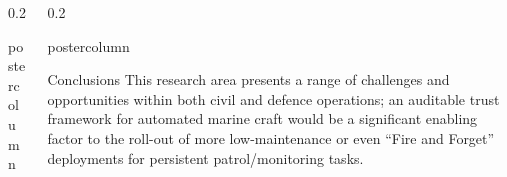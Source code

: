 \documentclass[final,hyperref={pdfpagelabels=false}]{beamer}
\def\colwidth{0.2\linewidth}
\begin{document}
\begin{frame}[fragile]
\begin{columns}[T]
\begin{column}{\colwidth}
\begin{beamercolorbox}[center,wd=\textwidth]{postercolumn}
\begin{minipage}[T]{.98\textwidth}
{					}
				\end{minipage}
			\end{beamercolorbox}
		\end{column}
		\begin{column}{\colwidth}
			\begin{beamercolorbox}[center,wd=\textwidth]{postercolumn}
				\begin{minipage}[T]{.98\textwidth} %
					\parbox[t]{\textwidth}{ %
						
						\begin{block}{Conclusions}
							This research area presents a range of challenges and opportunities within both civil and defence operations; an auditable trust framework for automated marine craft would be a significant enabling factor to the roll-out of more low-maintenance or even ``Fire and Forget'' deployments for persistent patrol/monitoring tasks. 
							
							\vspace{0.3\baselineskip}
							

\end{block}}
\end{minipage}
\end{beamercolorbox}
\end{column}
\end{columns}
\end{frame}
\end{document}
